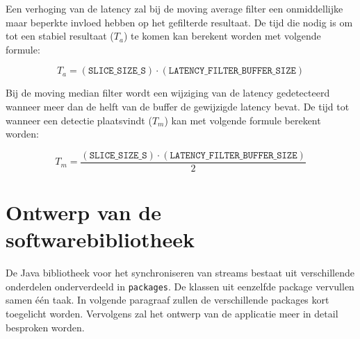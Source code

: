 Een verhoging van de latency zal bij de moving average filter een onmiddellijke maar beperkte invloed hebben op het gefilterde resultaat. De tijd die nodig is om tot een stabiel resultaat ($ T_a $) te komen kan berekent worden met volgende formule:

\begin{equation}
	T_a = (\texttt{SLICE\_SIZE\_S}) \cdot (\texttt{LATENCY\_FILTER\_BUFFER\_SIZE})
\end{equation}

Bij de moving median filter wordt een wijziging van de latency gedetecteerd wanneer meer dan de helft van de buffer de gewijzigde latency bevat. De tijd tot wanneer een detectie plaatsvindt ($ T_m $) kan met volgende formule berekent worden:

\begin{equation}
T_m = \frac{(\texttt{SLICE\_SIZE\_S}) \cdot (\texttt{LATENCY\_FILTER\_BUFFER\_SIZE})}{2}
\end{equation}

\section{Ontwerp van de softwarebibliotheek}

De Java bibliotheek voor het synchroniseren van streams bestaat uit verschillende onderdelen onderverdeeld in \texttt{packages}. De klassen uit eenzelfde package vervullen samen één taak. In volgende paragraaf zullen de verschillende packages kort toegelicht worden. Vervolgens zal het ontwerp van de applicatie meer in detail besproken worden.

